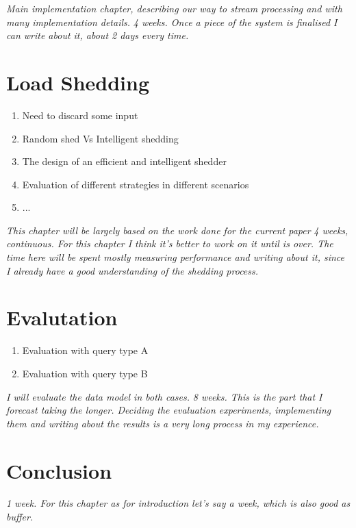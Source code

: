 
\emph{Main implementation chapter, describing our way to stream processing and with many implementation details.}
\emph{4 weeks. Once a piece of the system is finalised I can write about it, about 2 days every time. } 
\section{Load Shedding}
\begin{enumerate}
	\item Need to discard some input
	\item Random shed Vs Intelligent shedding
	\item The design of an efficient and intelligent shedder
	\item Evaluation of different strategies in different scenarios
	\item ...
\end{enumerate}
\emph{This chapter will be largely based on the work done for the current paper}
\emph{4 weeks, continuous. For this chapter I think it's better to work on it until is over. The time here will be spent mostly measuring performance and writing about it, since I already have a good understanding of the shedding process.}

\section{Evalutation}
\begin{enumerate}
	\item Evaluation with query type A
	\item Evaluation with query type B
\end{enumerate}
\emph{I will evaluate the data model in both cases.}
\emph{8 weeks. This is the part that I forecast taking the longer. Deciding the evaluation experiments, implementing them and writing about the results is a very long process in my experience.}
\section{Conclusion}
\emph{1 week. For this chapter as for introduction let's say a week, which is also good as buffer.}
%
